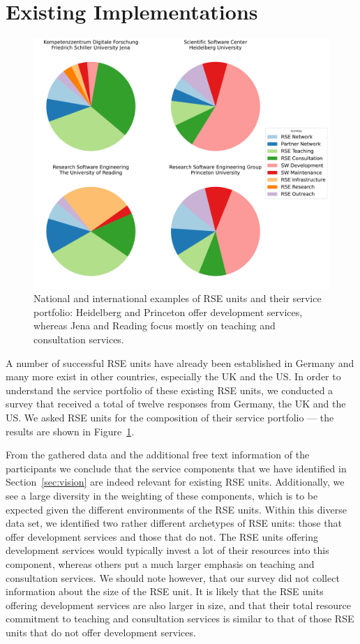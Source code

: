 \documentclass[a4paper]{article}
\begin{document}
\section{Existing Implementations}

\begin{figure}
\centering
\includegraphics[width=\textwidth]{./group_composition_plot/group_composition_plot_the_fantastic_four.pdf}
\caption{National and international examples of RSE units and their service portfolio: Heidelberg and Princeton offer development services, whereas Jena and Reading focus mostly on teaching and consultation services.}%
\label{fig:survey}
\end{figure}

A number of successful RSE units have already been established in Germany and many more exist in other countries, especially the UK and the US\@.
In order to understand the service portfolio of these existing RSE units, we conducted a survey that received a total of twelve responses from Germany, the UK and the US\@.
We asked RSE units for the composition of their service portfolio --- the results are shown in Figure~\ref{fig:survey}.

From the gathered data and the additional free text information of the participants we conclude that the service components that we have identified in Section~\ref{sec:vision} are indeed relevant for existing RSE units.
Additionally, we see a large diversity in the weighting of these components, which is to be expected given the different environments of the RSE units.
Within this diverse data set, we identified two rather different archetypes of RSE units: those that offer development services and those that do not.
The RSE units offering development services would typically invest a lot of their resources into this component, whereas others put a much larger emphasis on teaching and consultation services.
We should note however, that our survey did not collect information about the size of the RSE unit.
It is likely that the RSE units offering development services are also larger in size,
and that their total resource commitment to teaching and consultation services is similar to that of those RSE units that do not offer development services.
\end{document}
